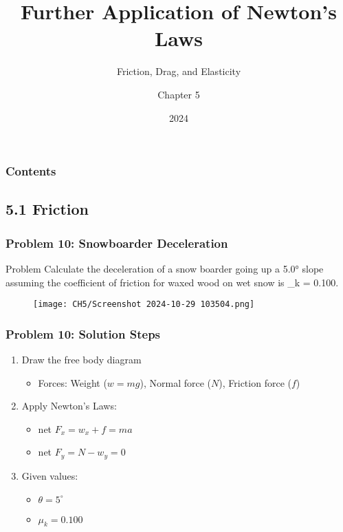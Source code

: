 \documentclass{beamer}
\title{Further Application of Newton's Laws}
\subtitle{Friction, Drag, and Elasticity}
\author{Chapter 5}
\date{2024}
\begin{document}
\frame{\titlepage}

\begin{frame}
\frametitle{Contents}
\tableofcontents
\end{frame}

\subsection{5.1 Friction}
\begin{frame}
\frametitle{Problem 10: Snowboarder Deceleration}
\begin{block}{Problem}
Calculate the deceleration of a snow boarder going up a 5.0° slope assuming the coefficient of friction for waxed wood on wet snow is \mu_k = 0.100.
\end{block}

\begin{figure}[H]
    \centering
    \texttt{[image: CH5/Screenshot 2024-10-29 103504.png]}
\end{figure}
\end{frame}

\begin{frame}
\frametitle{Problem 10: Solution Steps}
\begin{enumerate}
\item Draw the free body diagram
    \begin{itemize}
    \item Forces: Weight ($w = mg$), Normal force ($N$), Friction force ($f$)
    \end{itemize}
\item Apply Newton's Laws:
    \begin{itemize}
    \item net $F_x = w_x + f = ma$
    \item net $F_y = N - w_y = 0$
    \end{itemize}
\item Given values:
    \begin{itemize}
    \item $\theta = 5^\circ$
    \item $\mu_k = 0.100$
    \end{itemize}
\end{enumerate}
\end{frame}
\end{document}
